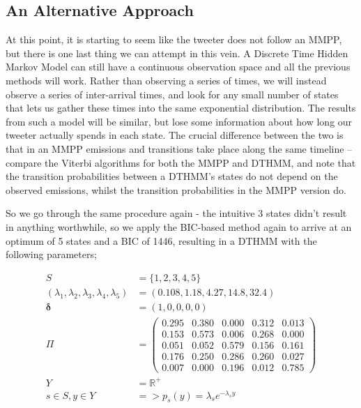 \subsection{An Alternative Approach}

At this point, it is starting to seem like the tweeter does not follow an MMPP, but there is one last thing we can attempt in this vein. A Discrete Time Hidden Markov Model can still have a continuous observation space and all the previous methods will work. Rather than observing a series of times, we will instead observe a series of inter-arrival times, and look for any small number of states that lets us gather these times into the same exponential distribution. The results from such a model will be similar, but lose some information about how long our tweeter actually spends in each state. The crucial difference between the two is that in an MMPP emissions and transitions take place along the same timeline -- compare the Viterbi algorithms for both the MMPP and DTHMM, and note that the transition probabilities between a DTHMM's states do not depend on the observed emissions, whilst the transition probabilities in the MMPP version do.

So we go through the same procedure again - the intuitive 3 states didn't result in anything worthwhile, so we apply the BIC-based method again to arrive at an optimum of 5 states and a BIC of 1446, resulting in a DTHMM with the following parameters;

\begin{align*}
S &= \{1,2,3,4,5\}\\
(\lambda_1,\lambda_2,\lambda_3,\lambda_4,\lambda_5) &= (0.108, 1.18, 4.27, 14.8, 32.4)\\
\bm{\delta} &= (1,0,0,0,0)\\
\Pi &= 
\left(
    \begin{matrix}
    0.295 & 0.380 & 0.000 & 0.312 & 0.013 \\
    0.153 & 0.573 & 0.006 & 0.268 & 0.000 \\
    0.051 & 0.052 & 0.579 & 0.156 & 0.161 \\
    0.176 & 0.250 & 0.286 & 0.260 & 0.027 \\
    0.007 & 0.000 & 0.196 & 0.012 & 0.785
    \end{matrix}
\right)\\
Y &= \mathbb{R}^{+}\\
s \in S, y \in Y &=> p_s(y) = \lambda_s e^{-\lambda_sy}\\
\end{align*}

